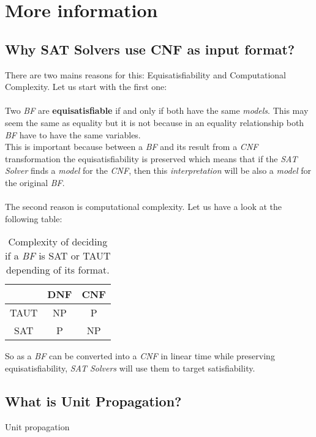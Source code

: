 
\chapter{More information} %

\label{AppendixA} %

\section{Why SAT Solvers use CNF as input format?}
\label{A.1}

There are two mains reasons for this: Equisatisfiability and Computational Complexity. Let us start with the first one: \\\\

Two \emph{BF} are \textbf{equisatisfiable} if and only if both have the same \emph{models}. This may seem the same as equality but it is not because in an equality relationship both \emph{BF} have to have the same variables. \\
This is important because between a \emph{BF} and its result from a \emph{CNF} transformation the equisatisfiability is preserved which means that if the \emph{SAT Solver} finds a \emph{model} for the \emph{CNF}, then this \emph{interpretation} will be also a \emph{model} for the original \emph{BF}.\\\\

The second reason is computational complexity. Let us have a look at the following table:

\begin{table}[h]
	\centering
	\begin{tabular}{c|c|c|}
		\cline{2-3}
		& DNF & CNF \\ \hline\hline
		\multicolumn{1}{|c||}{TAUT} & NP  & P   \\ \hline
		\multicolumn{1}{|c||}{SAT}  & P   & NP  \\ \hline
	\end{tabular}
	\caption{Complexity of deciding if a \emph{BF} is SAT or TAUT depending of its format.}
	\label{my-label}
\end{table}


So as a \emph{BF} can be converted into a \emph{CNF} in linear time while preserving equisatisfiability, \emph{SAT Solvers} will use them to target satisfiability.

\section{What is Unit Propagation?}
\label{A.2}
Unit propagation 